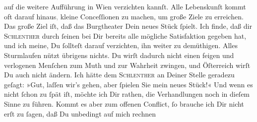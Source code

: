 \begin{ledgroupsized}[t]{13cm}
               auf die weitere Aufführung in Wien verzichten
               kannſt. Alle Lebenskunſt kommt oft darauf hinaus\textcolor{gray}{,} kleine
               Conceſſionen zu machen, um große Ziele zu erreichen. Das große Ziel iſt, daß das Burgtheater Dein neues Stück ſpielt. Ich finde, daß dir \textsc{Schlenther} durch ſeinen \label{K_L02893-4v}\label{K_L02893-4h} bei Dir bereits alle mögliche Satisfaktion gegeben hat, und ich meine, Du
               ſollteſt darauf verzichten, ihn weiter zu demüthigen. Alles Sturmlaufen \strikeout{\textcolor{gray}{nu}} nützt übrigens nichts. Du wirſt dadurch nicht einen feigen und verlogenen
               Menſchen zum Muth und zur Wahrheit  zwingen, und Öſterreich wirſt Du auch
               nicht ändern. Ich hätte dem \textsc{Schlenther} an Deiner Stelle geradezu geſagt: »Gut, laſſen wir’s gehen, aber ſpielen Sie
               mein neues Stück!« Und {\pb}wenn es nicht ſchon zu ſpät iſt, möchte ich Dir
               rathen, die Verhandlungen noch in dieſem Sinne zu führen. Kommt es aber zum offenen
               Conflict, ſo brauche ich Dir nicht erſt zu ſagen, daß Du unbedingt auf mich rechnen

\end{ledgroupsized}
